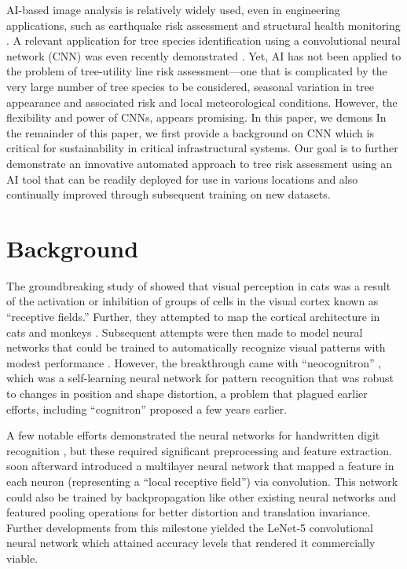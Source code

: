 \documentclass[11pt,twoside]{article}
\numberwithin{equation}{section}
\newcommand{\?}{\stackrel{?}{=}}
\begin{document}
AI-based image analysis is relatively widely used, even in engineering applications, such as earthquake risk assessment
\cite{jiao2020artificial,salehi2018emerging} and structural health monitoring \cite{spencer2019advances}. A relevant
application for tree species identification using a convolutional neural network (CNN) was even recently demonstrated
\cite{fricker2019convolutional}. Yet, AI has not been applied to the problem of tree-utility line risk assessment---one
that is complicated by the very large number of tree species to be considered, seasonal variation in tree appearance and
associated risk and local meteorological conditions. However, the flexibility and power of CNNs, appears promising. In
this paper, we demons In the remainder of this paper, we first provide a background on CNN which is critical for
sustainability in critical infrastructural systems. Our goal is to further demonstrate an innovative automated approach
to tree risk assessment using an AI tool that can be readily deployed for use in various locations and also continually
improved through subsequent training on new datasets.


\section{Background}
The groundbreaking study of \citet{hubel1959receptive} showed that visual perception in cats was a result of the
activation or inhibition of groups of cells in the visual cortex known as ``receptive fields.''  Further, they attempted
to map the cortical architecture in cats and monkeys \cite{hubel1962receptive,hubel1965receptive,hubel1968receptive}.
Subsequent attempts were then made to model neural networks that could be trained to automatically recognize visual
patterns with modest performance \cite{rosenblatt1962principles,kabrisky1966proposed,giebel1971feature,fukushima1975cognitron}. However, the breakthrough came with ``neocognitron'' \cite{fukushima1980neocognitron}, which
was a self-learning neural network for pattern recognition that was robust to changes in position and shape distortion,
a problem that plagued earlier efforts, including ``cognitron'' \cite{fukushima1975cognitron} proposed a few years
earlier.

A few notable efforts demonstrated the neural networks for handwritten digit recognition
\cite{fukushima1988neocognitron,denker1988neural}, but these required significant preprocessing and feature
extraction. \cite{lecun1989handwritten} soon afterward introduced a multilayer neural network that mapped a feature in
each neuron (representing a ``local receptive field'') via convolution. This network could also be trained by
backpropagation like other existing neural networks and featured pooling operations for better distortion and
translation invariance. Further developments from this milestone yielded the LeNet-5 convolutional neural network which
attained accuracy levels that rendered it commercially viable.
\end{document}
